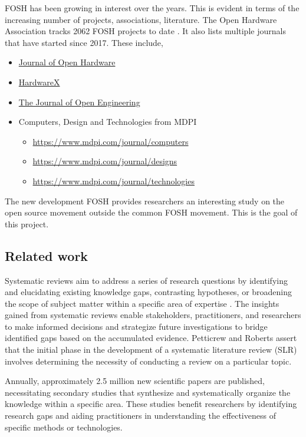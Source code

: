 \documentclass[final-report.tex]{subfiles}
\begin{document}
FOSH has been growing in interest over the years. 
This is evident in terms of the increasing number of projects, associations, literature. 
The Open Hardware Association tracks 
2062 
FOSH projects to date \cite{OSH_association_def}.
It also lists multiple journals that have started since 2017.
These include, 
\begin{itemize}
    \item \href{https://openhardware.metajnl.com/}{Journal of Open Hardware}
    \item \href{https://www.sciencedirect.com/journal/hardwarex}{HardwareX}
    \item \href{https://www.tjoe.org/}{The Journal of Open Engineering}
    \item Computers, Design and Technologies from MDPI
        \begin{itemize}
            \item \href{Computers}{https://www.mdpi.com/journal/computers}
            \item \href{Designs}{https://www.mdpi.com/journal/designs}
            \item \href{Technologies}{https://www.mdpi.com/journal/technologies}
        \end{itemize}
\end{itemize}

The new development FOSH provides researchers an interesting study on the open source movement outside the common FOSH movement. 
This is the goal of this project. 

\subsection{Related work}
Systematic reviews aim to address a series of research questions by identifying and elucidating existing knowledge gaps, contrasting hypotheses, or broadening the scope of subject matter within a specific area of expertise \cite{gough2017introduction}. 
The insights gained from systematic reviews enable stakeholders, practitioners, and researchers to make informed decisions and strategize future investigations to bridge identified gaps based on the accumulated evidence. 
Petticrew and Roberts \cite{petticrew2008systematic} assert that the initial phase in the development of a systematic literature review (SLR) involves determining the necessity of conducting a review on a particular topic.

Annually, approximately 2.5 million new scientific papers are published, necessitating secondary studies that synthesize and systematically organize the knowledge within a specific area. 
These studies benefit researchers by identifying research gaps and aiding practitioners in understanding the effectiveness of specific methods or technologies.
\end{document}
